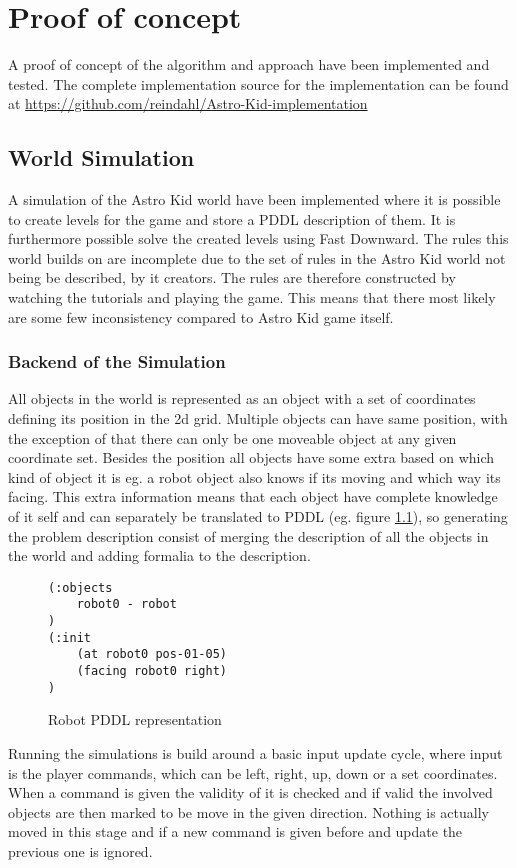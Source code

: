 \chapter{Proof of concept}
A proof of concept of the algorithm and approach have been implemented and tested. The complete implementation source for the implementation can be found at  \url{https://github.com/reindahl/Astro-Kid-implementation}
\section{World Simulation}
	A simulation of the Astro Kid world have been implemented where it is possible to create levels for the game and store a PDDL description of them. It is furthermore possible solve the created levels using Fast Downward.
	The rules this world builds on are incomplete due to the set of rules in the Astro Kid world not being be described, by it creators. The rules are therefore constructed by watching the tutorials and playing the game. This means that there most likely are some few inconsistency compared to Astro Kid game itself.


	\subsection{Backend of the Simulation}
	All objects in the world is represented as an object with a set of coordinates defining its position in the 2d grid. Multiple objects can have same position, with the exception of that there can only be one moveable object at any given coordinate set. Besides the position all objects have some extra based on which kind of object it is eg. a robot object also knows if its moving and which way its facing. This extra information means that each object have complete knowledge of it self and can separately be translated to PDDL (eg. figure \ref{robotpddl}), so generating the problem description consist of merging the description of all the objects  in the world and adding formalia to the description.
	\begin{figure}
	\caption{Robot PDDL representation}
	\label{robotpddl}
	\begin{lstlisting}
(:objects
	robot0 - robot
)
(:init
	(at robot0 pos-01-05)
	(facing robot0 right)
)
	\end{lstlisting}
	
		\end{figure}
	Running the simulations is build around a basic input update cycle, where input is the player commands, which can be left, right, up, down or a set coordinates. When a command is given the validity of it is checked and if valid the involved objects are then marked to be move in the given direction. Nothing is actually moved in this stage and if a new command is given before and update the previous one is ignored.
	
